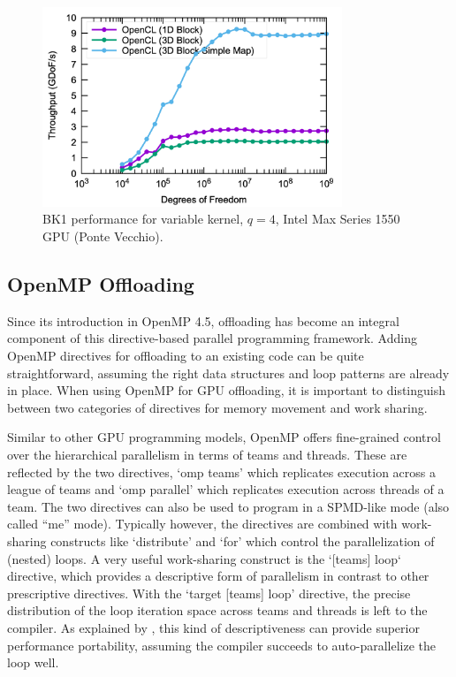 \documentclass[a4paper,12pt]{article}
\begin{document}
\begin{figure}[htbp]
  \centering
  \includegraphics[width=0.8\textwidth]{pvc_opencl_q4_dynamic} %
  \caption{BK1 performance for variable kernel, $q = 4$, Intel Max Series 1550 GPU (Ponte Vecchio).}
  \label{fig:pvc_dynamic}
\end{figure}

\subsection{OpenMP Offloading}

Since its introduction in OpenMP 4.5, offloading has become an integral component
of this directive-based parallel programming framework.
Adding OpenMP directives for offloading to an existing code can be quite straightforward,
assuming the right data structures and loop patterns are already in place.
When using OpenMP for GPU offloading, it is important to distinguish between two
categories of directives for memory movement and work sharing.

Similar to other GPU programming models, OpenMP offers fine-grained control over the hierarchical parallelism in terms of teams and threads. These are reflected by the two directives, `omp teams' which replicates execution across a league of teams and `omp parallel' which replicates execution across threads of a team. 
The two directives can also be used to program in a SPMD-like mode (also called ``me'' mode). 
Typically however, the directives are combined with work-sharing
constructs like `distribute' and `for' which control the parallelization of (nested) loops.
A very useful work-sharing construct is the `[teams] loop` directive, which provides 
a descriptive form of parallelism in contrast to other prescriptive directives.
With the `target [teams] loop' directive, the precise distribution of the loop iteration space across teams and threads is left to the compiler. 
As explained by \cite{Deakin23}, this kind of descriptiveness can provide
superior performance portability, assuming the compiler succeeds to auto-parallelize
the loop well.
\end{document}
